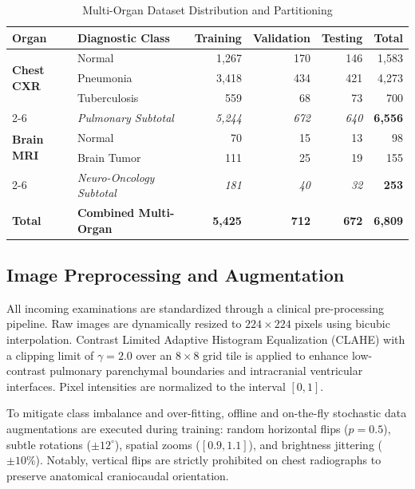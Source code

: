 \documentclass[journal]{IEEEtran}
\begin{document}
\begin{table}[!t]
\caption{Multi-Organ Dataset Distribution and Partitioning}
\label{tab:dataset_composition}
\centering
\scriptsize
\renewcommand{\arraystretch}{1.15}
\begin{tabular}{l l r r r r}
\toprule
\textbf{Organ} & \textbf{Diagnostic Class} & \textbf{Training} & \textbf{Validation} & \textbf{Testing} & \textbf{Total} \\
\midrule
\multirow{3}{*}{\textbf{Chest CXR}} & Normal & 1,267 & 170 & 146 & 1,583 \\
 & Pneumonia & 3,418 & 434 & 421 & 4,273 \\
 & Tuberculosis & 559 & 68 & 73 & 700 \\
\cmidrule{2-6}
 & \textit{Pulmonary Subtotal} & \textit{5,244} & \textit{672} & \textit{640} & \textbf{6,556} \\
\midrule
\multirow{2}{*}{\textbf{Brain MRI}} & Normal & 70 & 15 & 13 & 98 \\
 & Brain Tumor & 111 & 25 & 19 & 155 \\
\cmidrule{2-6}
 & \textit{Neuro-Oncology Subtotal} & \textit{181} & \textit{40} & \textit{32} & \textbf{253} \\
\midrule
\textbf{Total} & \textbf{Combined Multi-Organ} & \textbf{5,425} & \textbf{712} & \textbf{672} & \textbf{6,809} \\
\bottomrule
\end{tabular}
\end{table}

\subsection{Image Preprocessing and Augmentation}
All incoming examinations are standardized through a clinical pre-processing pipeline. Raw images are dynamically resized to $224 \times 224$ pixels using bicubic interpolation. Contrast Limited Adaptive Histogram Equalization (CLAHE) with a clipping limit of $\gamma=2.0$ over an $8\times8$ grid tile is applied to enhance low-contrast pulmonary parenchymal boundaries and intracranial ventricular interfaces. Pixel intensities are normalized to the interval $[0, 1]$. 

To mitigate class imbalance and over-fitting, offline and on-the-fly stochastic data augmentations are executed during training: random horizontal flips ($p=0.5$), subtle rotations ($\pm 12^\circ$), spatial zooms ($[0.9, 1.1]$), and brightness jittering ($\pm 10\%$). Notably, vertical flips are strictly prohibited on chest radiographs to preserve anatomical craniocaudal orientation.
\end{document}
